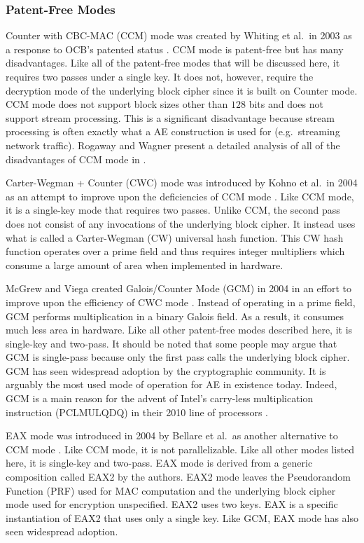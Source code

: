 \subsubsection{Patent-Free Modes}
Counter with CBC-MAC (CCM) mode was created by Whiting et al.\ in 2003 as a response to OCB's patented status \cite{Whiting2003_CCM}. CCM mode is patent-free but has many disadvantages.
Like all of the patent-free modes that will be discussed here, it requires two passes under a single key.
It does not, however, require the decryption mode of the underlying block cipher since it is built on Counter mode.
CCM mode does not support block sizes other than $128$ bits and does not support stream processing.
This is a significant disadvantage because stream processing is often exactly what a AE construction is used for (e.g.\ streaming network traffic).
Rogaway and Wagner present a detailed analysis of all of the disadvantages of CCM mode in \cite{Rogaway2003_CritiqueOfCCM}.

Carter-Wegman + Counter (CWC) mode was introduced by Kohno et al.\ in 2004 as an attempt to improve upon the deficiencies of CCM mode \cite{Kohno2004_CWC}.
Like CCM mode, it is a single-key mode that requires two passes.
Unlike CCM, the second pass does not consist of any invocations of the underlying block cipher.
It instead uses what is called a Carter-Wegman (CW) universal hash function.
This CW hash function operates over a prime field and thus requires integer multipliers which consume a large amount of area when implemented in hardware.

McGrew and Viega created Galois/Counter Mode (GCM) in 2004 in an effort to improve upon the efficiency of CWC mode \cite{McGrew2004_GCM}.
Instead of operating in a prime field, GCM performs multiplication in a binary Galois field.
As a result, it consumes much less area in hardware.
Like all other patent-free modes described here, it is single-key and two-pass.
It should be noted that some people may argue that GCM is single-pass because only the first pass calls the underlying block cipher.
GCM has seen widespread adoption by the cryptographic community.
It is arguably the most used mode of operation for AE in existence today.
Indeed, GCM is a main reason for the advent of Intel's carry-less multiplication instruction (PCLMULQDQ) in their 2010 line of processors \cite{Gueron2010_IntelGCM}.

EAX mode was introduced in 2004 by Bellare et al.\ as another alternative to CCM mode \cite{Bellare2004_EAX}.
Like CCM mode, it is not parallelizable.
Like all other modes listed here, it is single-key and two-pass.
EAX mode is derived from a generic composition called EAX2 by the authors.
EAX2 mode leaves the Pseudorandom Function (PRF) used for MAC computation and the underlying block cipher mode used for encryption unspecified.
EAX2 uses two keys.
EAX is a specific instantiation of EAX2 that uses only a single key.
Like GCM, EAX mode has also seen widespread adoption.

